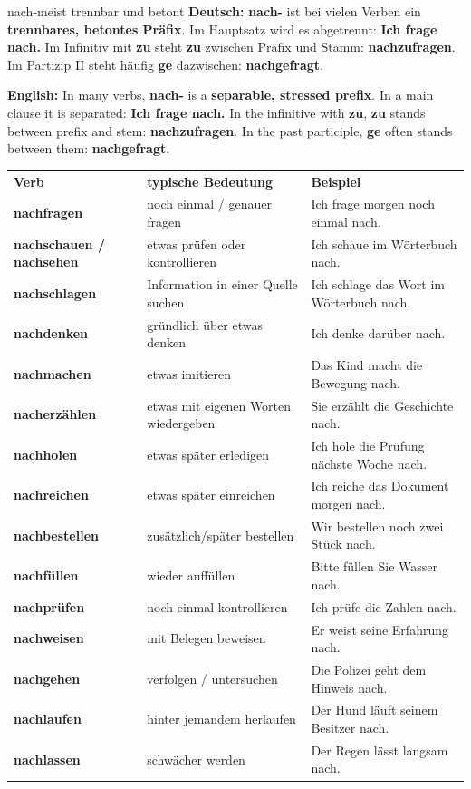 \documentclass[a4paper,11pt]{article}
\newcommand{\GermanText}[1]{\textbf{Deutsch: }#1\par}
\newcommand{\EnglishText}[1]{{\small\color{SoftGray}\textbf{English: }#1\par}}
\begin{document}
        \begin{grammarentry}{nach-}{meist trennbar und betont}
            \GermanText{\textbf{nach-} ist bei vielen Verben ein \textbf{trennbares, betontes Präfix}. Im Hauptsatz wird es abgetrennt: \textbf{Ich frage nach.} Im Infinitiv mit \textbf{zu} steht \textbf{zu} zwischen Präfix und Stamm: \textbf{nachzufragen}. Im Partizip II steht häufig \textbf{ge} dazwischen: \textbf{nachgefragt}.}
            \EnglishText{In many verbs, \textbf{nach-} is a \textbf{separable, stressed prefix}. In a main clause it is separated: \textbf{Ich frage nach.} In the infinitive with \textbf{zu}, \textbf{zu} stands between prefix and stem: \textbf{nachzufragen}. In the past participle, \textbf{ge} often stands between them: \textbf{nachgefragt}.}
        \end{grammarentry}

        \begin{longtable}{>{\bfseries}p{3.7cm}|p{5.2cm}|p{5.2cm}}
            \rowcolor{HeaderBlueDark}
            \color{white}\textbf{Verb} &
            \color{white}\textbf{typische Bedeutung} &
            \color{white}\textbf{Beispiel} \\
            nachfragen & noch einmal / genauer fragen & Ich frage morgen noch einmal nach. \\
            nachschauen / nachsehen & etwas prüfen oder kontrollieren & Ich schaue im Wörterbuch nach. \\
            nachschlagen & Information in einer Quelle suchen & Ich schlage das Wort im Wörterbuch nach. \\
            nachdenken & gründlich über etwas denken & Ich denke darüber nach. \\
            nachmachen & etwas imitieren & Das Kind macht die Bewegung nach. \\
            nacherzählen & etwas mit eigenen Worten wiedergeben & Sie erzählt die Geschichte nach. \\
            nachholen & etwas später erledigen & Ich hole die Prüfung nächste Woche nach. \\
            nachreichen & etwas später einreichen & Ich reiche das Dokument morgen nach. \\
            nachbestellen & zusätzlich/später bestellen & Wir bestellen noch zwei Stück nach. \\
            nachfüllen & wieder auffüllen & Bitte füllen Sie Wasser nach. \\
            nachprüfen & noch einmal kontrollieren & Ich prüfe die Zahlen nach. \\
            nachweisen & mit Belegen beweisen & Er weist seine Erfahrung nach. \\
            nachgehen & verfolgen / untersuchen & Die Polizei geht dem Hinweis nach. \\
            nachlaufen & hinter jemandem herlaufen & Der Hund läuft seinem Besitzer nach. \\
            nachlassen & schwächer werden & Der Regen lässt langsam nach. \\
        \end{longtable}
\end{document}
